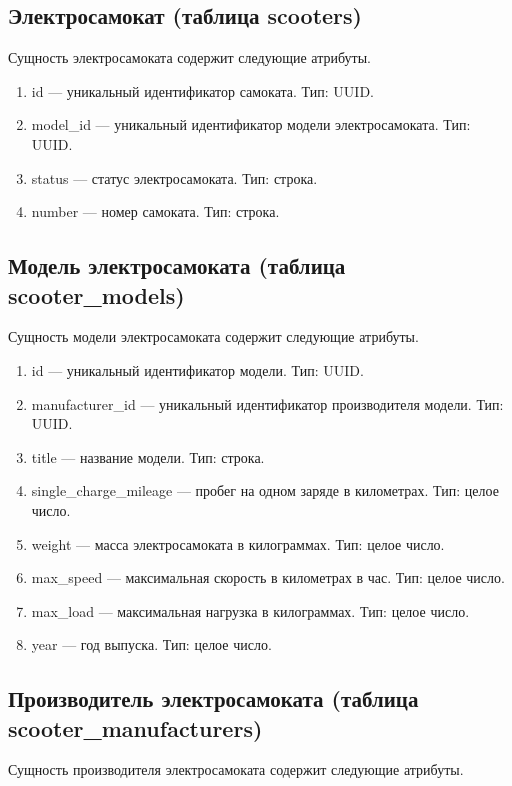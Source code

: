 \subsection*{Электросамокат (таблица scooters)}

Сущность электросамоката содержит следующие атрибуты.

\begin{enumerate}
	\item id --- уникальный идентификатор самоката. Тип: UUID.
	\item model\_id --- уникальный идентификатор модели электросамоката. Тип: UUID.
	\item status --- статус электросамоката. Тип: строка.
	\item number --- номер самоката. Тип: строка.
\end{enumerate}

\subsection*{Модель электросамоката (таблица scooter\_models)}

Сущность модели электросамоката содержит следующие атрибуты.

\begin{enumerate}
	\item id --- уникальный идентификатор модели. Тип: UUID.
	\item manufacturer\_id --- уникальный идентификатор производителя модели. Тип: UUID.
	\item title --- название модели. Тип: строка.
	\item single\_charge\_mileage --- пробег на одном заряде в километрах. Тип: целое
	      число.
	\item weight --- масса электросамоката в килограммах. Тип: целое число.
	\item max\_speed --- максимальная скорость в километрах в час. Тип: целое число.
	\item max\_load --- максимальная нагрузка в килограммах. Тип: целое число.
	\item year --- год выпуска. Тип: целое число.
\end{enumerate}

\subsection*{Производитель электросамоката (таблица scooter\_manufacturers)}

Сущность производителя электросамоката содержит следующие атрибуты.

